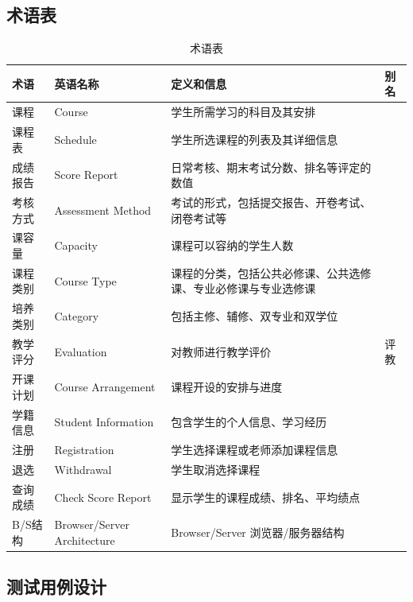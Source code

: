 \subsection{术语表}
  \begin{table}[H]
    \caption{术语表}
    \begin{tabularx}{\textwidth}{|l|l|X|l|}
    \hline
    \textbf{术语} & \textbf{英语名称} & \textbf{定义和信息} & \textbf{别名}\\
    \hline
    课程&Course&学生所需学习的科目及其安排&\\
    \hline
    课程表&Schedule&学生所选课程的列表及其详细信息&\\
    \hline
    成绩报告&Score Report&日常考核、期末考试分数、排名等评定的数值&\\
    \hline
    考核方式&Assessment Method&考试的形式，包括提交报告、开卷考试、闭卷考试等&\\
    \hline
    课容量&Capacity&课程可以容纳的学生人数&\\
    \hline
    课程类别&Course Type&课程的分类，包括公共必修课、公共选修课、专业必修课与专业选修课&\\
    \hline
    培养类别&Category&包括主修、辅修、双专业和双学位&\\
    \hline
    教学评分&Evaluation&对教师进行教学评价&评教\\
    \hline
    开课计划&Course Arrangement&课程开设的安排与进度&\\
    \hline
    学籍信息&Student Information&包含学生的个人信息、学习经历&\\
    \hline
    注册&Registration&学生选择课程或老师添加课程信息&\\
    \hline
    退选&Withdrawal&学生取消选择课程&\\
    \hline
    查询成绩&Check Score Report&显示学生的课程成绩、排名、平均绩点&\\
    \hline
    B/S结构&Browser/Server Architecture&Browser/Server 浏览器/服务器结构&\\
    \hline
  \end{tabularx}
  
\end{table}


\subsection{测试用例设计}

